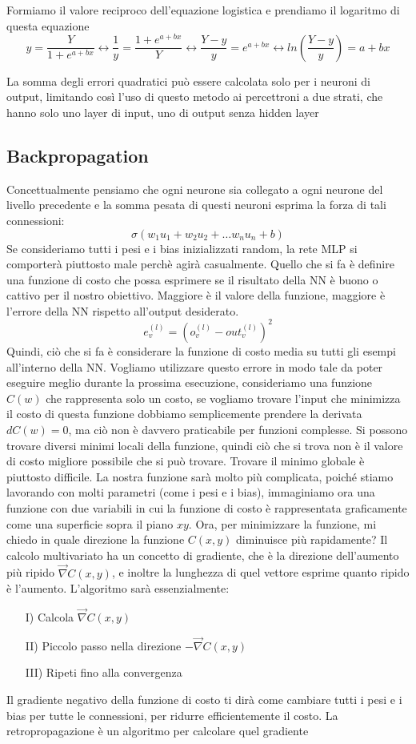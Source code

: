 Formiamo il valore reciproco dell'equazione logistica e prendiamo il logaritmo di questa equazione
$$y = \frac{Y}{1 + e^{a+bx}} \leftrightarrow \frac{1}{y} = \frac{1 + e^{a+bx}}{Y} \leftrightarrow \frac{Y - y}{y} = e^{a+bx} \leftrightarrow ln(\frac{Y - y}{y}) = a+bx$$

La somma degli errori quadratici può essere calcolata solo per i neuroni di output, limitando così l'uso di questo metodo ai percettroni a due strati, che hanno solo uno layer di input, uno di output senza hidden layer

\subsection{Backpropagation}
Concettualmente pensiamo che ogni neurone sia collegato a ogni neurone del livello precedente e la somma pesata di questi neuroni esprima la forza di tali connessioni:
$$\sigma(w_1u_1 + w_2u_2 + \dots w_nu_n + b)$$
Se consideriamo tutti i pesi e i bias inizializzati random, la rete MLP si comporterà piuttosto male perchè agirà casualmente. Quello che si fa è definire una funzione di costo che possa esprimere se il risultato della NN è buono o cattivo per il nostro obiettivo. Maggiore è il valore della funzione, maggiore è l'errore della NN rispetto all'output desiderato.
$$e_v^{(l)}=(o_v^{(l)} - out_v^{(l)})^2$$
Quindi, ciò che si fa è considerare la funzione di costo media su tutti gli esempi all'interno della NN. Vogliamo utilizzare questo errore in modo tale da poter eseguire meglio durante la prossima esecuzione, consideriamo una funzione $C(w)$ che rappresenta solo un costo, se vogliamo trovare l'input che minimizza il costo di questa funzione dobbiamo semplicemente prendere la derivata $dC(w) = 0$, ma ciò non è davvero praticabile per funzioni complesse. Si possono trovare diversi minimi locali della funzione, quindi ciò che si trova non è il valore di costo migliore possibile che si può trovare. Trovare il minimo globale è piuttosto difficile. La nostra funzione sarà molto più complicata, poiché stiamo lavorando con molti parametri (come i pesi e i bias), immaginiamo ora una funzione con due variabili in cui la funzione di costo è rappresentata graficamente come una superficie sopra il piano $xy$. Ora, per minimizzare la funzione, mi chiedo in quale direzione la funzione $C(x, y)$ diminuisce più rapidamente? Il calcolo multivariato ha un concetto di gradiente, che è la direzione dell'aumento più ripido $\vec{\nabla}C(x, y)$, e inoltre la lunghezza di quel vettore esprime quanto ripido è l'aumento. L'algoritmo sarà essenzialmente:
\begin{itemize}
    \item[I)] Calcola $\vec{\nabla}C(x, y)$
    \item[II)] Piccolo passo nella direzione $-\vec{\nabla}C(x, y)$
    \item[III)] Ripeti fino alla convergenza
\end{itemize}
Il gradiente negativo della funzione di costo ti dirà come cambiare tutti i pesi e i bias per tutte le connessioni, per ridurre efficientemente il costo.  La retropropagazione è un algoritmo per calcolare quel gradiente

